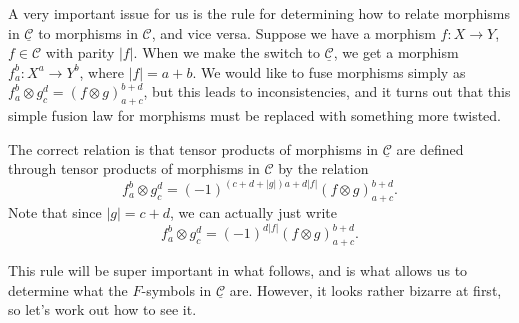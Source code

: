 \documentclass[12pt,a4paper]{article}
\newcommand{\tp}{\otimes}
\newcommand{\ra}{\rightarrow}
\newcommand{\ulmcc}{\underline{\mathcal{C}}}
\newcommand\be            {\begin{equation}}
\newcommand\ee            {\end{equation}}
\newcommand{\mcc}{\mathcal{C}}
\begin{document}
A very important issue for us is the rule for determining how to relate morphisms in $\ulmcc$ to morphisms in $\mcc$, and vice versa. Suppose we have a morphism $f : X \ra Y$, $f\in \mcc$ with parity $|f|$. When we make the switch to $\ulmcc$, we get a morphism $f_a^b : X^a \ra Y^b$, where $|f| = a+b$. We would like to fuse morphisms simply as $f_a^b \tp g_c^d = (f\tp g)^{b+d}_{a+c}$, but this leads to inconsistencies, and it turns out that this simple fusion law for morphisms must be replaced with something more twisted. %
 
The correct relation is that tensor products of morphisms in $\ulmcc$ are defined through tensor products of morphisms in $\mcc$ by the relation  
\be f_a^b \tp g_c^d = (-1)^{(c+d+|g|)a+d|f|}(f\tp g)^{b+d}_{a+c}.\ee
Note that since $|g| = c+d$, we can actually just write 
\be \label{morphdef} f_a^b \tp g_c^d = (-1)^{d|f|}(f\tp g)^{b+d}_{a+c}.\ee

This rule will be super important in what follows, and is what allows us to determine what the $F$-symbols in $\ulmcc$ are. However, it looks rather bizarre at first, so let's work out how to see it. 
\end{document}
